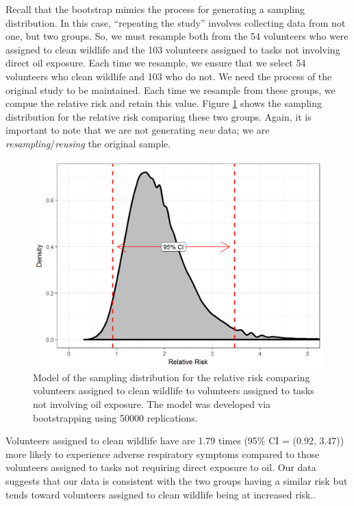 \documentclass[]{book}
\theoremstyle{definition}
\theoremstyle{definition}
\theoremstyle{remark}
\begin{document}
Recall that the bootstrap mimics the process for generating a sampling
distribution. In this case, ``repeating the study'' involves collecting
data from not one, but two groups. So, we must resample both from the 54
volunteers who were assigned to clean wildlife and the 103 volunteers
assigned to tasks not involving direct oil exposure. Each time we
resample, we ensure that we select 54 volunteers who clean wildlife and
103 who do not. We need the process of the original study to be
maintained. Each time we resample from these groups, we compue the
relative risk and retain this value. Figure
\ref{fig:recaplanguage-sampling-distribution} shows the sampling
distribution for the relative risk comparing these two groups. Again, it
is important to note that we are not generating \emph{new} data; we are
\emph{resampling}/\emph{reusing} the original sample.

\begin{figure}

{\centering \includegraphics[width=0.8\linewidth]{./Images/recaplanguage-sampling-distribution-1} 

}

\caption{Model of the sampling distribution for the relative risk comparing volunteers assigned to clean wildlife to volunteers assigned to tasks not involving oil exposure.  The model was developed via bootstrapping using 50000 replications.}\label{fig:recaplanguage-sampling-distribution}
\end{figure}

Volunteers assigned to clean wildlife have are 1.79 times (95\% CI =
(0.92, 3.47)) more likely to experience adverse respiratory symptoms
compared to those volunteers assigned to tasks not requiring direct
exposure to oil. Our data suggests that our data is consistent with the
two groups having a similar risk but tends toward volunteers assigned to
clean wildlife being at increased risk..
\end{document}

